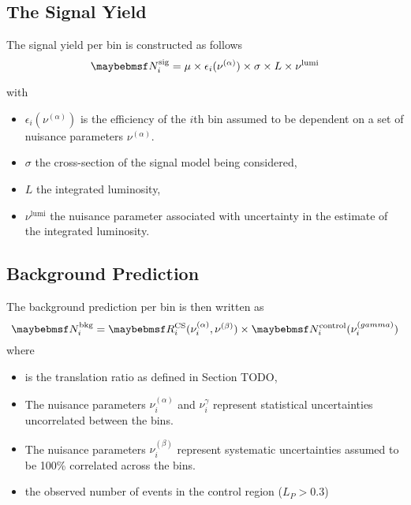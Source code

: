\subsection{The Signal Yield}
The signal yield per bin is constructed as follows
\begin{equation}
\NSigi = \mu \times \epsilon_i(\nu^{(\alpha)}) \times \sigma \times L \times \nu^{\textrm{lumi}}
\end{equation}

with
\begin{itemize}
\item $\epsilon_i(\nu^{(\alpha)})$ is the efficiency of the $i$th bin assumed to be
  dependent on a set of nuisance parameters $\nu^{(\alpha)}$.
\item $\sigma$ the cross-section of the signal model being considered,
\item $L$ the integrated luminosity,
\item $\nu^{\textrm{lumi}}$ the nuisance parameter associated with uncertainty in the
estimate of the integrated luminosity.
\end{itemize}

\subsection{Background Prediction}
The background prediction per bin is then written as
\begin{equation}
\NBkgi = \RCSi(\nu_i^{(\alpha)}, \nu^{(\beta)}) \times \NControli(\nu_i^{(\gamma)})
\end{equation}
where
\begin{itemize}
\item \RCSi is the translation ratio as defined in Section TODO,
\item The nuisance parameters $\nu_i^{(\alpha)}$ and $\nu_i^{\gamma}$ represent
  statistical uncertainties uncorrelated between the bins.
\item The nuisance parameters $\nu_i^{(\beta)}$ represent systematic
  uncertainties assumed to be 100\% correlated across the bins.
\item \NControli the observed number of events in the control region
($L_P > 0.3$)
\end{itemize}


